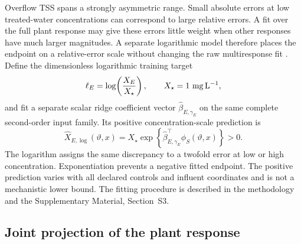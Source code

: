 \documentclass[a4paper,fleqn]{cas-sc}
\begin{document}
Overflow TSS spans a strongly asymmetric range. Small absolute errors at low treated-water concentrations can correspond to large relative errors. A fit over the full plant response may give these errors little weight when other responses have much larger magnitudes. A separate logarithmic model therefore places the endpoint on a relative-error scale without changing the raw multiresponse fit \citep{Tofallis2015}. Define the dimensionless logarithmic training target
\begin{equation}
\ell_E=\log\!\left(\frac{X_E}{X_\star}\right),
\qquad X_\star=1\ {\rm mg\,L^{-1}},
\label{eq:logtarget}
\end{equation}
and fit a separate scalar ridge coefficient vector $\widehat\beta_{E,\gamma_E}$ on the same complete second-order input family. Its positive concentration-scale prediction is
\begin{equation}
\widehat X_{E,\log}(\vartheta,x)
=X_\star\exp\!\left\{\widehat\beta_{E,\gamma_E}^{\top}
\phi_S(\vartheta,x)\right\}>0.
\label{eq:logclosure}
\end{equation}
The logarithm assigns the same discrepancy to a twofold error at low or high concentration. Exponentiation prevents a negative fitted endpoint. The positive prediction varies with all declared controls and influent coordinates and is not a mechanistic lower bound. The fitting procedure is described in the methodology and the Supplementary Material, Section~S3.

\subsection{Joint projection of the plant response}
\end{document}
